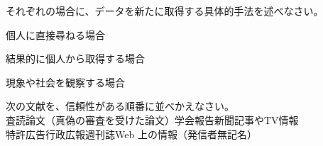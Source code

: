 \begin{exercise}
    \item{}
    それぞれの場合に、データを新たに取得する具体的手法を述べなさい。
    \begin{exenum}
        \item 個人に直接尋ねる場合
        \item 結果的に個人から取得する場合
        \item 現象や社会を観察する場合
    \end{exenum}
    
    \item{}
    次の文献を、信頼性がある順番に並べかえなさい。\\
    査読論文（真偽の審査を受けた論文）\hfill 学会報告\hfill 新聞記事やTV情報\\
    特許\qquad 広告\qquad 行政広報\qquad 週刊誌\qquad Web 上の情報（発信者無記名）
\end{exercise}
